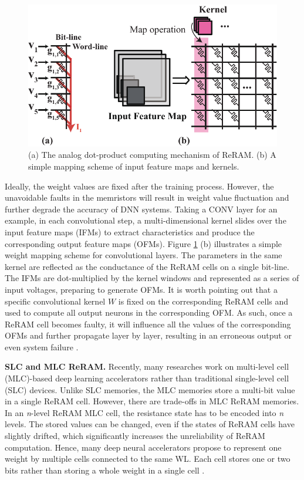 \begin{figure}
    \centering
    \includegraphics[width=0.6\linewidth]{images/OL-fig1}
    \caption{(a) The analog dot-product computing mechanism of ReRAM. (b) A simple mapping scheme of input feature maps and kernels.}
    \label{fig:reramcomputing}
    \vspace {-10pt}
\end{figure}

Ideally, the weight values are fixed after the training process. However, the unavoidable faults in the memristors will result in weight value fluctuation and further degrade the accuracy of DNN systems. Taking a CONV layer for an example, in each convolutional step, a multi-dimensional kernel slides over the input feature maps (IFMs)  to extract characteristics and produce the corresponding output feature maps (OFMs).  Figure \ref{fig:reramcomputing} (b) illustrates a simple weight mapping scheme for convolutional layers. The parameters in the same kernel are reflected as the conductance of the ReRAM cells on a single bit-line. The IFMs are dot-multiplied by the kernel windows and represented as a series of input voltages, preparing to generate OFMs. It is worth pointing out that a specific convolutional kernel ${W}$ is fixed on the corresponding ReRAM cells and used to compute all output neurons in the corresponding OFM. As such, once a ReRAM cell becomes faulty, it will influence all the values of the corresponding OFMs and further propagate layer by layer, resulting in an erroneous output or even system failure \cite{Li:2017:UEP:3126908.3126964, xu2020hybrid, xu2021reliability}. 

{\bf SLC and MLC ReRAM.} Recently, many researches work on multi-level cell (MLC)-based deep learning accelerators rather than traditional single-level cell (SLC) devices. Unlike SLC memories, the MLC memories store a multi-bit value in a single ReRAM cell. However, there are trade-offs in MLC ReRAM memories. In an \emph{n}-level ReRAM MLC cell, the resistance state has to be encoded into \emph{n} levels. The stored values can be changed, even if the states of ReRAM cells have slightly drifted, which significantly increases the unreliability of ReRAM computation. Hence, many deep neural accelerators propose to represent one weight by multiple cells connected to the same WL. Each cell stores one or two bits rather than storing a whole weight in a single cell \cite{8715178}.  

